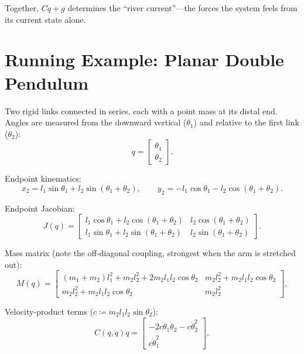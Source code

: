\documentclass[11pt]{article}
\begin{document}
Together, $C\dot{q} + g$ determines the ``river current''---the forces the system feels from its current state alone.


\section{Running Example: Planar Double Pendulum}\label{sec:double-pendulum}

Two rigid links connected in series, each with a point mass at its distal end. Angles are measured from the downward vertical ($\theta_1$) and relative to the first link ($\theta_2$):
\begin{equation}\label{eq:dp-coords}
q = \begin{bmatrix}\theta_1 \\ \theta_2\end{bmatrix}.
\end{equation}

Endpoint kinematics:
\begin{equation}\label{eq:dp-kinematics}
x_2 = l_1\sin\theta_1 + l_2\sin(\theta_1+\theta_2), \qquad
y_2 = -l_1\cos\theta_1 - l_2\cos(\theta_1+\theta_2).
\end{equation}

Endpoint Jacobian:
\begin{equation}\label{eq:dp-jacobian}
J(q) = \begin{bmatrix}
l_1\cos\theta_1 + l_2\cos(\theta_1+\theta_2) & l_2\cos(\theta_1+\theta_2) \\
l_1\sin\theta_1 + l_2\sin(\theta_1+\theta_2) & l_2\sin(\theta_1+\theta_2)
\end{bmatrix}.
\end{equation}

Mass matrix (note the off-diagonal coupling, strongest when the arm is stretched out):
\begin{equation}\label{eq:dp-mass}
M(q) = \begin{bmatrix}
(m_1+m_2)l_1^2 + m_2l_2^2 + 2m_2l_1l_2\cos\theta_2 & m_2l_2^2+m_2l_1l_2\cos\theta_2 \\
m_2l_2^2+m_2l_1l_2\cos\theta_2 & m_2l_2^2
\end{bmatrix},
\end{equation}

Velocity-product terms ($c \coloneqq m_2l_1l_2\sin\theta_2$):
\begin{equation}\label{eq:dp-coriolis}
C(q,\dot{q})\dot{q} = \begin{bmatrix}
-2c\dot\theta_1\dot\theta_2 - c\dot\theta_2^2 \\
c\dot\theta_1^2
\end{bmatrix},
\end{equation}
\end{document}
